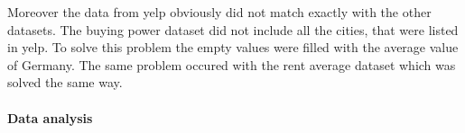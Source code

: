 Moreover the data from yelp obviously did not match exactly with the other datasets. The buying power dataset did not include all the cities, that were listed in yelp. To solve this problem the empty values were filled with the average value of Germany. The same problem occured with the rent average dataset which was solved the same way.

\paragraph{Data analysis}
\label{subsec:Data analysis}
